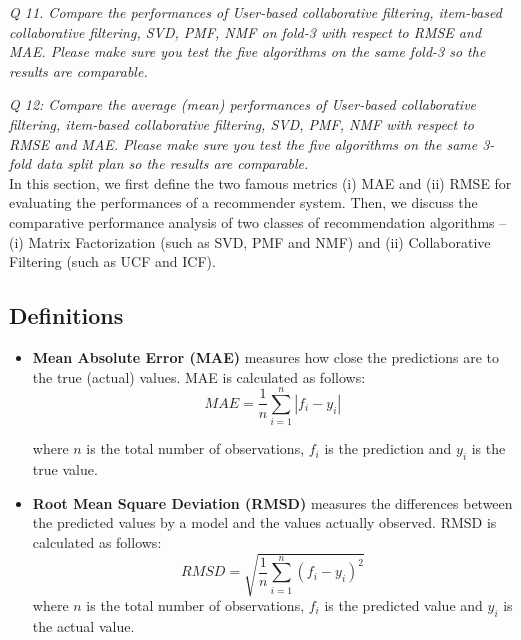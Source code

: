 \documentclass[journal,onecolumn]{IEEEtran}
\begin{document}
\textit{Q 11. Compare the performances of User-based collaborative filtering, item-based collaborative
filtering, SVD, PMF, NMF on fold-3 with respect to RMSE and MAE. Please make sure you test
the five algorithms on the same fold-3 so the results are comparable. }

\textit{Q 12: Compare the average (mean) performances of User-based collaborative filtering, item-based
collaborative filtering, SVD, PMF, NMF with respect to RMSE and MAE. Please make sure you
test the five algorithms on the same 3-fold data split plan so the results are comparable. } \\

 In this section, we first define the two famous metrics (i) MAE and (ii) RMSE for evaluating the performances of a recommender system. Then, we discuss the comparative performance analysis of two classes of recommendation algorithms -- (i) Matrix Factorization (such as SVD, PMF and NMF) and (ii) Collaborative Filtering (such as UCF and ICF).

\subsection{Definitions}
\begin{itemize}
\item \textbf{Mean Absolute Error (MAE)} measures how close the predictions are to the true (actual) values. MAE is calculated as follows:
\begin{equation}
MAE = \frac{1}{n} \sum_{i=1}^n |f_i - y_i|
\end{equation}

where $n$ is the total number of observations, $f_i$ is the prediction and $y_i$ is the true value.

\item \textbf{Root Mean Square Deviation (RMSD)} measures the differences between the predicted values by a model and the values actually observed. RMSD is calculated as follows:
\begin{equation}
RMSD = \sqrt{\frac{1}{n} \sum_{i=1}^{n} (f_i - y_i)^2}
\end{equation}
where $n$ is the total number of observations, $f_i$ is the predicted value and $y_i$ is the actual value.
\end{itemize}
\end{document}
